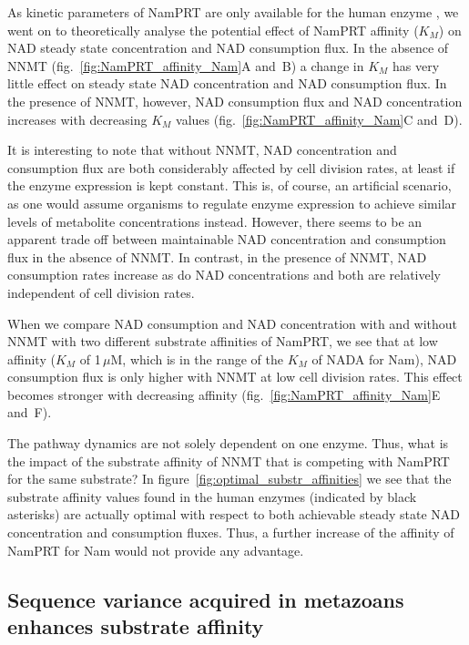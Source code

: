 As kinetic parameters of NamPRT are only available for the human enzyme \cite{Burgos2008}, we went on to theoretically analyse the potential effect of NamPRT affinity ($K_{M}$) on NAD steady state concentration and NAD consumption flux. In the absence of NNMT (fig.~\ref{fig:NamPRT_affinity_Nam}A and~B) a change in $K_{M}$ has very little effect on steady state NAD concentration and NAD consumption flux. In the presence of NNMT, however, NAD consumption flux and NAD concentration increases with decreasing $K_{M}$ values (fig.~\ref{fig:NamPRT_affinity_Nam}C and~D).

It is interesting to note that without NNMT, NAD concentration and consumption flux are both considerably affected by cell division rates, at least if the enzyme expression is kept constant. This is, of course, an artificial scenario, as one would assume organisms to regulate enzyme expression to achieve similar levels of metabolite concentrations instead. However, there seems to be an apparent trade off between maintainable NAD concentration and consumption flux in the absence of NNMT. In contrast, in the presence of NNMT, NAD consumption rates increase as do NAD concentrations and both are relatively independent of cell division rates.

When we compare NAD consumption and NAD concentration with and without NNMT with two different substrate affinities of NamPRT, we see that at low affinity ($K_{M}$ of 1\,$\mu$M, which is in the range of the $K_{M}$ of NADA for Nam), NAD consumption flux is only higher with NNMT at low cell division rates. This effect becomes stronger with decreasing affinity (fig.~\ref{fig:NamPRT_affinity_Nam}E and~F).

The pathway dynamics are not solely dependent on one enzyme. Thus, what is the impact of the substrate affinity of NNMT that is competing with NamPRT for the same substrate? In figure~\ref{fig:optimal_substr_affinities} we see that the substrate affinity values found in the human enzymes (indicated by black asterisks) are actually optimal with respect to both achievable steady state NAD concentration and consumption fluxes. Thus, a further increase of the affinity of NamPRT for Nam would not provide any advantage.


\subsection{Sequence variance acquired in metazoans enhances substrate affinity}

